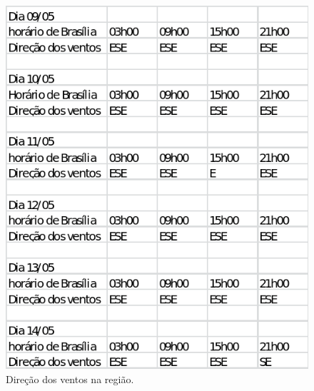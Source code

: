     \begin{figure}[h]
    \begin{center}
      \includegraphics[scale=0.6]{editaveis/figuras/estudo_ventos}
      \caption[Direção dos ventos na região]{Direção dos ventos na região. \footnotemark}
      \label{estudo_ventos}
    \end{center}
    \end{figure}
    \FloatBarrier
    
